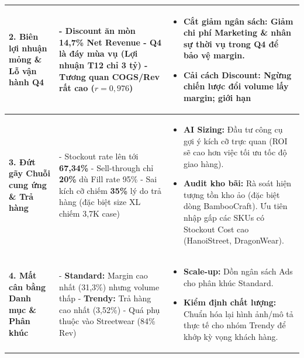 \documentclass{article}
\begin{document}
\begin{table}[H]
\begin{tabular}{p{2.5cm} p{4.6cm} p{5.8cm}}
\textbf{2. Biên lợi nhuận mỏng \newline \& Lỗ vận hành Q4} & 
- Discount ăn mòn \textbf{14,7\%} Net Revenue \newline
- Q4 là đáy mùa vụ (Lợi nhuận T12 chỉ 3 tỷ) \newline
- Tương quan COGS/Rev rất cao ($r=0,976$) & 
\vspace{-8pt}\begin{itemize}
    \item \textbf{Cắt giảm ngân sách:} Giảm chi phí Marketing \& nhân sự thời vụ trong Q4 để bảo vệ margin.
    \item \textbf{Cải cách Discount:} Ngừng chiến lược đổi volume lấy margin; giới hạn %
\end{itemize}\vspace{-8pt} \\

\midrule

\textbf{3. Đứt gãy Chuỗi cung ứng \newline \& Trả hàng} & 
- Stockout rate lên tới \textbf{67,34\%} \newline
- Sell-through chỉ \textbf{20\%} dù Fill rate 95\% \newline
- Sai kích cỡ chiếm \textbf{35\%} lý do trả hàng (đặc biệt size XL chiếm 3,7K case) & 
\vspace{-8pt}\begin{itemize}
    \item \textbf{AI Sizing:} Đầu tư công cụ gợi ý kích cỡ trực quan (ROI sẽ cao hơn việc tối ưu tốc độ giao hàng).
    \item \textbf{Audit kho bãi:} Rà soát hiện tượng tồn kho ảo (đặc biệt dòng BambooCraft). Ưu tiên nhập gấp các SKUs có Stockout Cost cao (HanoiStreet, DragonWear).
\end{itemize}\vspace{-8pt} \\

\midrule

\textbf{4. Mất cân bằng \newline Danh mục \& Phân khúc} & 
- \textbf{Standard:} Margin cao nhất (31,3\%) nhưng volume thấp \newline
- \textbf{Trendy:} Trả hàng cao nhất (3,52\%) \newline
- Quá phụ thuộc vào Streetwear (84\% Rev) & 
\vspace{-8pt}\begin{itemize}
    \item \textbf{Scale-up:} Dồn ngân sách Ads cho phân khúc Standard.
    \item \textbf{Kiểm định chất lượng:} Chuẩn hóa lại hình ảnh/mô tả thực tế cho nhóm Trendy để khớp kỳ vọng khách hàng.
\end{itemize}\vspace{-8pt} \\

\bottomrule
\end{tabular}
\end{table}
\end{document}
